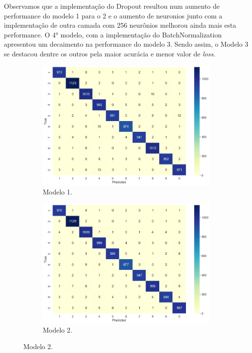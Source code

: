 \documentclass[12pt]{article}
\begin{document}
Observamos que a implementação do Dropout resultou num aumento de performance do modelo 1 para o 2 e o aumento de neuronios junto com a implementação de outra camada com 256 neurônios melhorou ainda mais esta performance. O 4° modelo, com a implementação do BatchNormalization apresentou um decaimento na performance do modelo 3. Sendo assim, o Modelo 3 se destacou dentre os outros pela maior acurácia e menor valor de \textit{loss}.

\begin{figure}[H]
	\centering
	\begin{subfigure}{0.4\linewidth}
		\centering
		\includegraphics[width=\linewidth]{Imagens/mlp_model1_conf.png}
		\caption{Modelo 1.}
		\label{fig:mlp_model1_conf}
	\end{subfigure}
	\begin{subfigure}{0.4\linewidth}
		\centering
		\includegraphics[width=\linewidth]{Imagens/mlp_model2_conf.png}
		\caption{Modelo 2.}
		\label{fig:mlp_model2_conf}
	\end{subfigure}


\end{figure}
\end{document}
